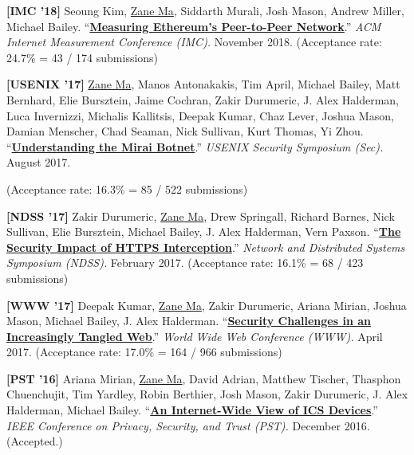 \documentclass[10pt,singlecolumn]{article} %
\begin{document}
\begin{etaremune}
\item \textbf{[IMC '18]}
Seoung Kim, \underline{Zane Ma}, Siddarth Murali, Josh Mason, Andrew Miller, Michael Bailey.
``\textbf{\href{https://zanema.com/papers/imc18_ethpeers.pdf}{Measuring Ethereum's Peer-to-Peer Network}}.''
\emph{ACM Internet Measurement Conference (IMC).} November 2018.
(Acceptance rate: 24.7\% = 43 / 174 submissions)
\vspace{6pt}


\item \textbf{[USENIX '17]}
\underline{Zane Ma}, Manos Antonakakis, Tim April, Michael Bailey, Matt Bernhard, Elie Bursztein, Jaime Cochran, Zakir Durumeric, J. Alex Halderman, Luca Invernizzi, Michalis Kallitsis, Deepak Kumar, Chaz Lever, Joshua Mason, Damian Menscher, Chad Seaman, Nick Sullivan, Kurt Thomas, Yi Zhou.
``\textbf{\href{https://zanema.com/papers/usenix17_mirai.pdf}{Understanding the Mirai Botnet}}.''
\emph{USENIX Security Symposium (Sec).} August 2017.

(Acceptance rate: 16.3\% = 85 / 522 submissions)
\vspace{6pt}


\item \textbf{[NDSS '17]}
Zakir Durumeric, \underline{Zane Ma}, Drew Springall, Richard Barnes, Nick Sullivan, Elie Bursztein, Michael Bailey, J. Alex Halderman, Vern Paxson.
``\textbf{\href{https://zanema.com/papers/ndss17_interception.pdf}{The Security Impact of HTTPS Interception}}.''
\emph{Network and Distributed Systems Symposium (NDSS).} February 2017.
(Acceptance rate: 16.1\% = 68 / 423 submissions)
\vspace{6pt}


\item \textbf{[WWW '17]}
Deepak Kumar, \underline{Zane Ma}, Zakir Durumeric, Ariana Mirian, Joshua Mason, Michael Bailey, J. Alex Halderman.
``\textbf{\href{https://zanema.com/papers/www17_tangled.pdf}{Security Challenges in an Increasingly Tangled Web}}.''
\emph{World Wide Web Conference (WWW).} April 2017.
(Acceptance rate: 17.0\% = 164 / 966 submissions)
\vspace{6pt}


\item \textbf{[PST '16]}
Ariana Mirian, \underline{Zane Ma}, David Adrian, Matthew Tischer, Thasphon Chuenchujit, Tim Yardley, Robin Berthier, Josh Mason, Zakir Durumeric, J. Alex Halderman, Michael Bailey.
``\textbf{\href{https://zanema.com/papers/pst16_ics.pdf}{An Internet-Wide View of ICS Devices}}.''
\emph{IEEE Conference on Privacy, Security, and Trust (PST).} December 2016. (Accepted.)
\vspace{6pt}

\end{etaremune}
\end{document}
